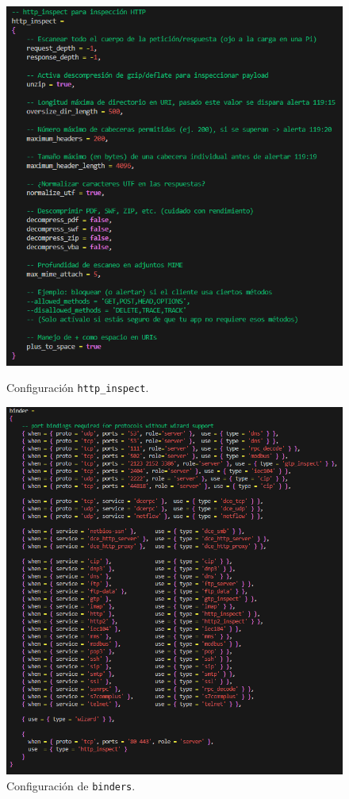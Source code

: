 \documentclass[11pt,a4paper,twoside]{report}
\begin{document}
\begin{figure}[H]
	\centering
	\begin{minipage}[b]{0.45\textwidth}
		\centering
		\includegraphics[scale=0.4]{http_inspect/4.png}
		\caption{Configuración \texttt{http\_inspect}.}
	\end{minipage}
	\hfill
	\begin{minipage}[b]{0.45\textwidth}
		\centering
		\includegraphics[scale=0.35]{http_inspect/5.png}
		\caption{Configuración de \texttt{binders}.}
	\end{minipage}
\end{figure}
\end{document}

